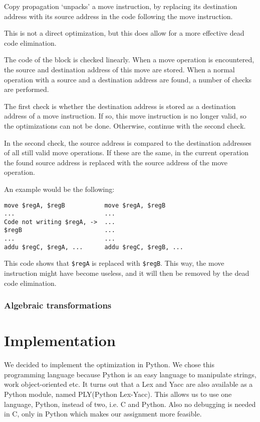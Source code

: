\documentclass[10pt,a4paper]{article}
\begin{document}
Copy propagation `unpacks' a move instruction, by replacing its destination
address with its source address in the code following the move instruction.

This is not a direct optimization, but this does allow for a more effective
dead code elimination.

The code of the block is checked linearly. When a move operation is
encountered, the source and destination address of this move are stored. When
a normal operation with a source and a destination address are found, a number
of checks are performed.

The first check is whether the destination address is stored as a destination
address of a move instruction. If so, this move instruction is no longer valid,
so the optimizations can not be done. Otherwise, continue with the second
check.

In the second check, the source address is compared to the destination
addresses of all still valid move operations. If these are the same, in the
current operation the found source address is replaced with the source address
of the move operation.

An example would be the following:
\begin{verbatim}
move $regA, $regB           move $regA, $regB
...                         ...
Code not writing $regA, ->  ...
$regB                       ...
...                         ...
addu $regC, $regA, ...      addu $regC, $regB, ...
\end{verbatim}
This code shows that \texttt{\$regA} is replaced with \texttt{\$regB}. This
way, the move instruction might have become useless, and it will then be
removed by the dead code elimination.

\subsubsection*{Algebraic transformations}



\section{Implementation}

We decided to implement the optimization in Python. We chose this programming
language because Python is an easy language to manipulate strings, work
object-oriented etc.
It turns out that a Lex and Yacc are also available as a Python module,
named PLY(Python Lex-Yacc). This allows us to use one language, Python, instead
of two, i.e. C and Python. Also no debugging is needed in C, only in Python
which makes our assignment more feasible.
\end{document}
